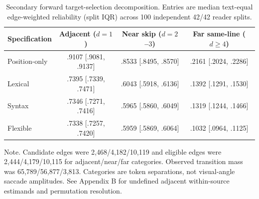 \begin{table}[tbp]
\centering
\small
\caption{Secondary forward target-selection decomposition. Entries are median text-equal edge-weighted reliability (split IQR) across 100 independent 42/42 reader splits.}
\label{tab:target-selection}
\begin{tabular}{lccc}
\toprule
Specification & Adjacent ($d=1$) & Near skip ($d=2$--$3$) & Far same-line ($d\geq4$) \\
\midrule
Position-only & .9107 [.9081, .9137] & .8533 [.8495, .8570] & .2161 [.2024, .2286] \\
Lexical & .7395 [.7339, .7471] & .6043 [.5918, .6136] & .1392 [.1291, .1530] \\
Syntax & .7346 [.7271, .7416] & .5965 [.5860, .6049] & .1319 [.1244, .1466] \\
Flexible & .7338 [.7257, .7420] & .5959 [.5869, .6064] & .1032 [.0964, .1125] \\
\bottomrule
\end{tabular}
\par\vspace{2pt}\footnotesize Note. Candidate edges were 2,468/4,182/10,119 and eligible edges were 2,444/4,179/10,115 for adjacent/near/far categories. Observed transition mass was 65,789/56,877/3,813. Categories are token separations, not visual-angle saccade amplitudes. See Appendix B for undefined adjacent within-source estimands and permutation resolution.
\end{table}
